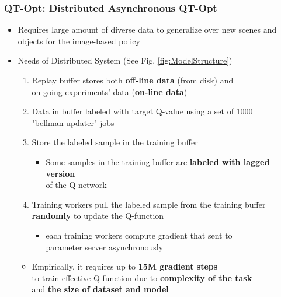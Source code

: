 \documentclass{beamer}
\newcommand{\forthSec}{QT-Opt}
\begin{document}
    \begin{frame}
      \frametitle{\forthSec : Distributed Asynchronous QT-Opt}
      \begin{itemize}
        \item Requires large amount of diverse data to generalize over new scenes and objects for the image-based policy
        \linebreak
        \pause
        \item Needs of Distributed System (See Fig. \ref{fig:ModelStructure})
        \pause
        \begin{enumerate}
          \item Replay buffer stores both \textbf{off-line data} (from disk) and \\ 
                on-going experiments' data (\textbf{on-line data})
          \pause
          \item Data in buffer labeled with target Q-value using a set of 1000 \\
                "bellman updater" jobs
          \pause
          \item Store the labeled sample in the training buffer
          \begin{itemize}
            \item Some samples in the training buffer are \textbf{labeled with lagged version} \\ 
                  of the Q-network
          \end{itemize}
          \pause
          \item Training workers pull the labeled sample from the training buffer \textbf{randomly} to update the Q-function
          \begin{itemize}
            \item each training workers compute gradient that sent to \\ 
                  parameter server asynchronously
          \end{itemize}
        \end{enumerate}
        \pause
        \begin{itemize}
          \item Empirically, it requires up to \textbf{15M gradient steps} \\
                to train effective Q-function due to \textbf{complexity of the task} \\ 
                and \textbf{the size of dataset and model}
        \end{itemize}
      \end{itemize}
    \end{frame}
\end{document}
